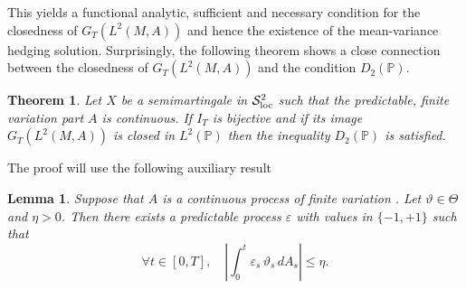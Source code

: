 \documentclass[11pt,a4paper,twoside,openany]{report}
\theoremstyle{plain} %
\newtheorem{theorem}{Theorem}[chapter]
\newtheorem{lemma}[lemma]{Lemma}
\theoremstyle{definition} %
\theoremstyle{remark} %
\begin{document}
This yields a functional analytic, sufficient and necessary condition for the closedness of \(G_T(L^2(M,A))\) and hence the existence of the mean-variance hedging solution. Surprisingly, the following theorem shows a close connection between the closedness of \(G_T(L^2(M,A))\) and the condition \(D_2(\mathbb{P})\). 
\begin{theorem}\label{thm:G_T closed implies D_2(P)}
    Let \(X\) be a semimartingale in \(\mathcal{S}^2_{\rm{loc}}\) such that the predictable, finite variation part \(A\) is continuous. If \(I_{T}\) is bijective and if its image \(G_T(L^2(M,A))\) is closed in \(L^2(\mathbb{P})\) then the inequality \(D_2(\mathbb{P})\) is satisfied. 
\end{theorem}
The proof will use the following auxiliary result

\begin{lemma}\label{lemma:predictable epsilon}
Suppose that $A$ is a continuous process of finite variation . Let $\vartheta \in \Theta$ and $\eta>0$. Then there exists a predictable process $\varepsilon$ with values in $\{-1,+1\}$ such that
\[
\forall t\in[0,T],\quad \left|\int_0^t \varepsilon_s\,\vartheta_s\,dA_s\right|\le \eta.
\]
\end{lemma}
\end{document}
